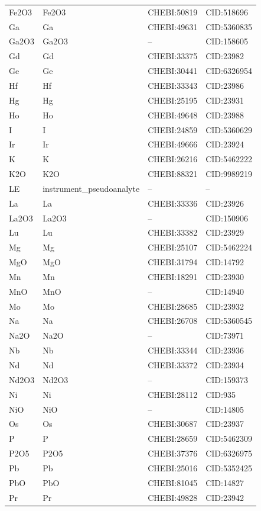 \begin{longtable}{llll}
Fe2O3 & Fe2O3 & CHEBI:50819 & CID:518696 \\
Ga & Ga & CHEBI:49631 & CID:5360835 \\
Ga2O3 & Ga2O3 & -- & CID:158605 \\
Gd & Gd & CHEBI:33375 & CID:23982 \\
Ge & Ge & CHEBI:30441 & CID:6326954 \\
Hf & Hf & CHEBI:33343 & CID:23986 \\
Hg & Hg & CHEBI:25195 & CID:23931 \\
Ho & Ho & CHEBI:49648 & CID:23988 \\
I & I & CHEBI:24859 & CID:5360629 \\
Ir & Ir & CHEBI:49666 & CID:23924 \\
K & K & CHEBI:26216 & CID:5462222 \\
K2O & K2O & CHEBI:88321 & CID:9989219 \\
LE & instrument\_pseudoanalyte & -- & -- \\
La & La & CHEBI:33336 & CID:23926 \\
La2O3 & La2O3 & -- & CID:150906 \\
Lu & Lu & CHEBI:33382 & CID:23929 \\
Mg & Mg & CHEBI:25107 & CID:5462224 \\
MgO & MgO & CHEBI:31794 & CID:14792 \\
Mn & Mn & CHEBI:18291 & CID:23930 \\
MnO & MnO & -- & CID:14940 \\
Mo & Mo & CHEBI:28685 & CID:23932 \\
Na & Na & CHEBI:26708 & CID:5360545 \\
Na2O & Na2O & -- & CID:73971 \\
Nb & Nb & CHEBI:33344 & CID:23936 \\
Nd & Nd & CHEBI:33372 & CID:23934 \\
Nd2O3 & Nd2O3 & -- & CID:159373 \\
Ni & Ni & CHEBI:28112 & CID:935 \\
NiO & NiO & -- & CID:14805 \\
Os & Os & CHEBI:30687 & CID:23937 \\
P & P & CHEBI:28659 & CID:5462309 \\
P2O5 & P2O5 & CHEBI:37376 & CID:6326975 \\
Pb & Pb & CHEBI:25016 & CID:5352425 \\
PbO & PbO & CHEBI:81045 & CID:14827 \\
Pr & Pr & CHEBI:49828 & CID:23942 \\

\end{longtable}
